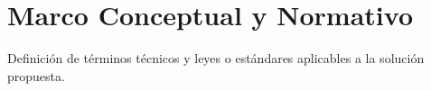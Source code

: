 \section{Marco Conceptual y Normativo}
Definición de términos técnicos y leyes o estándares aplicables a la solución propuesta.
